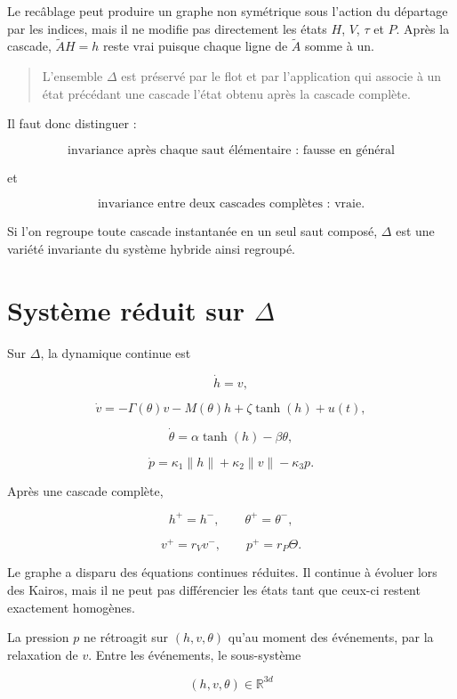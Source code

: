 Le recâblage peut produire un graphe non symétrique sous l'action du
départage par les indices, mais il ne modifie pas directement les
états \(H\), \(V\), \(\tau\) et \(P\). Après la cascade,
\(\widetilde A H=h\) reste vrai puisque chaque ligne de
\(\widetilde A\) somme à un.

\begin{quote}
L'ensemble \(\Delta\) est préservé par le flot et par l'application
qui associe à un état précédant une cascade l'état obtenu après la
cascade complète.
\end{quote}

Il faut donc distinguer :

\[
\boxed{
\text{invariance après chaque saut élémentaire : fausse en général}
}
\]

et

\[
\boxed{
\text{invariance entre deux cascades complètes : vraie}.
}
\]

Si l'on regroupe toute cascade instantanée en un seul saut composé,
\(\Delta\) est une variété invariante du système hybride ainsi
regroupé.

\section{Système réduit sur \texorpdfstring{$\Delta$}{Delta}}
\label{annexe-reduction-systeme-delta}

Sur \(\Delta\), la dynamique continue est

\[
\dot h=v,
\]

\[
\dot v
=
-\Gamma(\theta)v
-
M(\theta)h
+
\zeta\tanh(h)
+
u(t),
\]

\[
\dot\theta
=
\alpha\tanh(h)-\beta\theta,
\]

\[
\dot p
=
\kappa_1\|h\|
+
\kappa_2\|v\|
-
\kappa_3p.
\]

Après une cascade complète,

\[
h^+=h^-,
\qquad
\theta^+=\theta^-,
\]

\[
v^+=r_Vv^-,
\qquad
p^+=r_P\Theta.
\]

Le graphe a disparu des équations continues réduites. Il continue à
évoluer lors des Kairos, mais il ne peut pas différencier les états
tant que ceux-ci restent exactement homogènes.

La pression \(p\) ne rétroagit sur \((h,v,\theta)\) qu'au moment des
événements, par la relaxation de \(v\). Entre les événements, le
sous-système

\[
(h,v,\theta)\in\mathbb R^{3d}
\]

